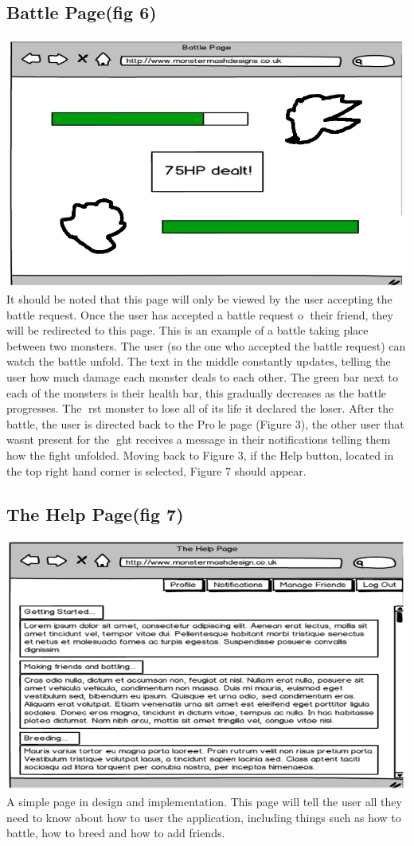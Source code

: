 \documentclass{project}
\begin{document}
\subsection{Battle Page(fig 6)}
\includegraphics[scale=0.5]{battle.jpg}\\
It should be noted that this page will only be viewed by the user accepting the battle
request. Once the user has accepted a battle request o their friend, they will be
redirected to this page.
This is an example of a battle taking place between two monsters. The user (so
the one who accepted the battle request) can watch the battle unfold. The text
in the middle constantly updates, telling the user how much damage each monster
deals to each other. The green bar next to each of the monsters is their health bar,
this gradually decreases as the battle progresses. The rst monster to lose all of its
life it declared the loser. After the battle, the user is directed back to the Prole
page (Figure 3), the other user that wasnt present for the ght receives a message
in their notifications telling them how the fight unfolded.
Moving back to Figure 3, if the Help button, located in the top right hand corner
is selected, Figure 7 should appear.

\subsection{The Help Page(fig 7)}
\includegraphics[scale=0.5]{help.jpg}\\
A simple page in design and implementation. This page will tell the user all they
need to know about how to user the application, including things such as how to
battle, how to breed and how to add friends.
\end{document}
